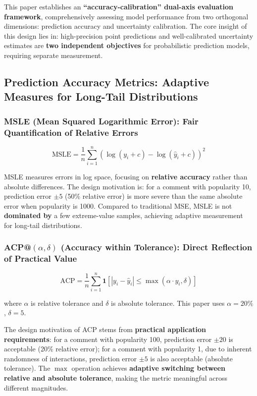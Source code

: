 \documentclass[10pt]{article}
\begin{document}
This paper establishes an \textbf{``accuracy-calibration'' dual-axis evaluation framework}, comprehensively assessing model performance from two orthogonal dimensions: prediction accuracy and uncertainty calibration. The core insight of this design lies in: high-precision point predictions and well-calibrated uncertainty estimates are \textbf{two independent objectives} for probabilistic prediction models, requiring separate measurement.

\subsection{Prediction Accuracy Metrics: Adaptive Measures for Long-Tail Distributions}

\subsubsection{MSLE (Mean Squared Logarithmic Error): Fair Quantification of Relative Errors}

\begin{equation}
\text{MSLE} = \frac{1}{n}\sum_{i=1}^{n}(\log(y_i + c) - \log(\hat{y}_i + c))^2
\end{equation}

MSLE measures errors in log space, focusing on \textbf{relative accuracy} rather than absolute differences. The design motivation is: for a comment with popularity 10, prediction error $\pm 5$ (50\% relative error) is more severe than the same absolute error when popularity is 1000. Compared to traditional MSE, MSLE is not \textbf{dominated by} a few extreme-value samples, achieving adaptive measurement for long-tail distributions.

\subsubsection{ACP@$(\alpha, \delta)$ (Accuracy within Tolerance): Direct Reflection of Practical Value}

\begin{equation}
\text{ACP} = \frac{1}{n}\sum_{i=1}^{n}\mathbf{1}[|y_i - \hat{y}_i| \leq \max(\alpha \cdot y_i, \delta)]
\end{equation}

where $\alpha$ is relative tolerance and $\delta$ is absolute tolerance. This paper uses $\alpha = 20\%$, $\delta = 5$.

The design motivation of ACP stems from \textbf{practical application requirements}: for a comment with popularity 100, prediction error $\pm 20$ is acceptable (20\% relative error); for a comment with popularity 1, due to inherent randomness of interactions, prediction error $\pm 5$ is also acceptable (absolute tolerance). The $\max$ operation achieves \textbf{adaptive switching between relative and absolute tolerance}, making the metric meaningful across different magnitudes.
\end{document}
